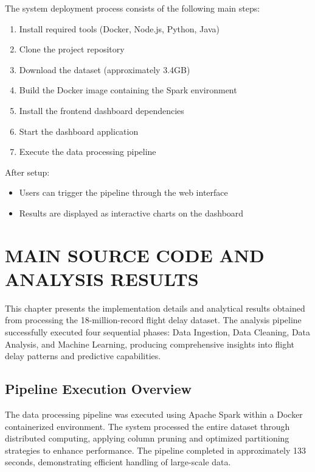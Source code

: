 \documentclass[12pt,a4paper]{report}
\begin{document}
The system deployment process consists of the following main steps:

\begin{enumerate}
    \item Install required tools (Docker, Node.js, Python, Java)
    \item Clone the project repository
    \item Download the dataset (approximately 3.4GB)
    \item Build the Docker image containing the Spark environment
    \item Install the frontend dashboard dependencies
    \item Start the dashboard application
    \item Execute the data processing pipeline
\end{enumerate}

After setup:
\begin{itemize}
    \item Users can trigger the pipeline through the web interface
    \item Results are displayed as interactive charts on the dashboard
\end{itemize}

\chapter{MAIN SOURCE CODE AND \\ ANALYSIS RESULTS}

This chapter presents the implementation details and analytical results obtained from processing the 18-million-record flight delay dataset. The analysis pipeline successfully executed four sequential phases: Data Ingestion, Data Cleaning, Data Analysis, and Machine Learning, producing comprehensive insights into flight delay patterns and predictive capabilities.

\section{Pipeline Execution Overview}

The data processing pipeline was executed using Apache Spark within a Docker containerized environment. The system processed the entire dataset through distributed computing, applying column pruning and optimized partitioning strategies to enhance performance. The pipeline completed in approximately 133 seconds, demonstrating efficient handling of large-scale data.
\end{document}
